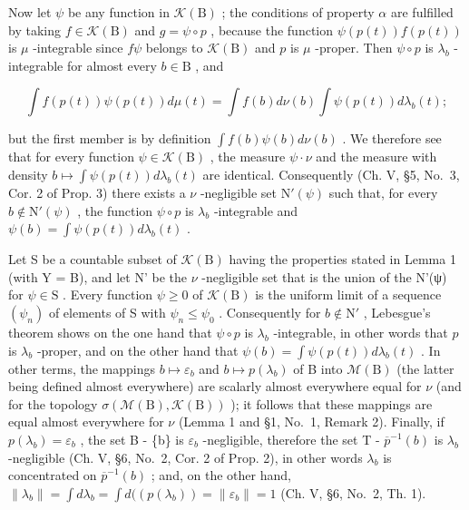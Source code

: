 Now let \(\psi\) be any function in \(\mathcal{K}(\mathrm{B})\) ; the conditions of property \(\alpha\) are fulfilled by taking \(f \in \mathcal{K}(\mathrm{B})\) and \(g = \psi \circ p\) , because the function \(\psi(p(t))f(p(t))\) is \(\mu\) -integrable since \(f\psi\) belongs to \(\mathcal{K}(\mathrm{B})\) and \(p\) is \(\mu\) -proper. Then \(\psi \circ p\) is \(\lambda_b\) -integrable for almost every \(b \in \mathrm{B}\) , and

\[
\int f (p (t)) \psi (p (t)) d \mu (t) = \int f (b) d \nu (b) \int \psi (p (t)) d \lambda_ {b} (t);
\]

but the first member is by definition \(\int f(b)\psi (b)d\nu (b)\) . We therefore see that for every function \(\psi \in \mathcal{K}(\mathrm{B})\) , the measure \(\psi \cdot \nu\) and the measure with density \(b\mapsto \int \psi (p(t))d\lambda_b(t)\) are identical. Consequently (Ch. V, §5, No.~3, Cor. 2 of Prop. 3) there exists a \(\nu\) -negligible set \(\mathrm{N}'(\psi)\) such that, for every \(b\notin \mathrm{N}'(\psi)\) , the function \(\psi \circ p\) is \(\lambda_{b}\) -integrable and \(\psi (b) = \int \psi (p(t))d\lambda_b(t)\) .

Let S be a countable subset of \(\mathcal{K}(\mathrm{B})\) having the properties stated in Lemma 1 (with Y = B), and let N' be the \(\nu\) -negligible set that is the union of the N'(ψ) for \(\psi \in \mathrm{S}\) . Every function \(\psi \geqslant 0\) of \(\mathcal{K}(\mathrm{B})\) is the uniform limit of a sequence \((\psi_n)\) of elements of S with \(\psi_n \leqslant \psi_0\) . Consequently for \(b \notin \mathrm{N}'\) , Lebesgue's theorem shows on the one hand that \(\psi \circ p\) is \(\lambda_b\) -integrable, in other words that \(p\) is \(\lambda_b\) -proper, and on the other hand that \(\psi(b) = \int \psi(p(t)) d\lambda_b(t)\) . In other terms, the mappings \(b \mapsto \varepsilon_b\) and \(b \mapsto p(\lambda_b)\) of B into \(\mathcal{M}(\mathrm{B})\) (the latter being defined almost everywhere) are scalarly almost everywhere equal for \(\nu\) (and for the topology \(\sigma(\mathcal{M}(\mathrm{B}), \mathcal{K}(\mathrm{B}))\) ); it follows that these mappings are equal almost everywhere for \(\nu\) (Lemma 1 and §1, No.~1, Remark 2). Finally, if \(p(\lambda_b) = \varepsilon_b\) , the set B - \{b\} is \(\varepsilon_b\) -negligible, therefore the set T - \(\overline{p}^{-1}(b)\) is \(\lambda_b\) -negligible (Ch. V, §6, No.~2, Cor. 2 of Prop. 2), in other words \(\lambda_b\) is concentrated on \(\overline{p}^{-1} (b)\) ; and, on the other hand, \(\| \lambda_b\| = \int d\lambda_b = \int d((p(\lambda_b)) = \| \varepsilon_b\| = 1\) (Ch. V, §6, No.~2, Th. 1).

